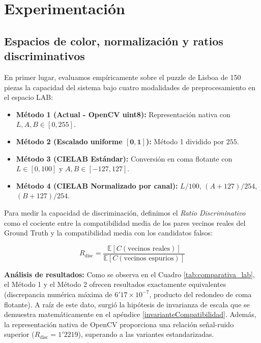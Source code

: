 \documentclass[a4paper]{article}
\theoremstyle{plain} %
\theoremstyle{plain} %
\begin{document}
\section{Experimentación}
\subsection{Espacios de color, normalización y ratios discriminativos}
\label{expEspaciosColor}
En primer lugar, evaluamos empíricamente sobre el puzzle de Lisboa de 150 piezas la capacidad del sistema bajo cuatro modalidades de preprocesamiento en el espacio LAB:

\begin{itemize}
    \item \textbf{Método 1 (Actual - OpenCV uint8):} Representación nativa con $L, A, B \in [0, 255]$.
    \item \textbf{Método 2 (Escalado uniforme $\bm{[0, 1]}$):} Método 1 dividido por $255$.
    \item \textbf{Método 3 (CIELAB Estándar):} Conversión en coma flotante con $L \in [0, 100]$ y $A, B \in [-127, 127]$.
    \item \textbf{Método 4 (CIELAB Normalizado por canal):} $L/100$, $(A + 127)/254$, $(B + 127)/254$.
\end{itemize}

Para medir la capacidad de discriminación, definimos el \textit{Ratio Discriminativo} como el cociente entre la compatibilidad media de los pares vecinos reales del Ground Truth y la compatibilidad media con los candidatos falsos:

\begin{equation*}
    R_{\text{disc}} = \frac{\mathbb{E}[C(\text{vecinos reales})]}{\mathbb{E}[C(\text{vecinos espurios})]}
\end{equation*}


\textbf{Análisis de resultados:} Como se observa en el Cuadro \ref{tab:comparativa_lab}, el Método 1 y el Método 2 ofrecen resultados exactamente equivalentes (discrepancia numérica máxima de $6'17 \times 10^{-7}$, 
producto del redondeo de coma flotante). A raíz de este dato, surgió la hipótesis de invarianza de escala que se demuestra matemáticamente en el apéndice \ref{invarianteCompatibilidad}. Además, la representación nativa de OpenCV proporciona una 
relación señal-ruido superior ($R_{\text{disc}} = 1'2219$), superando a las variantes estandarizadas.
\end{document}
